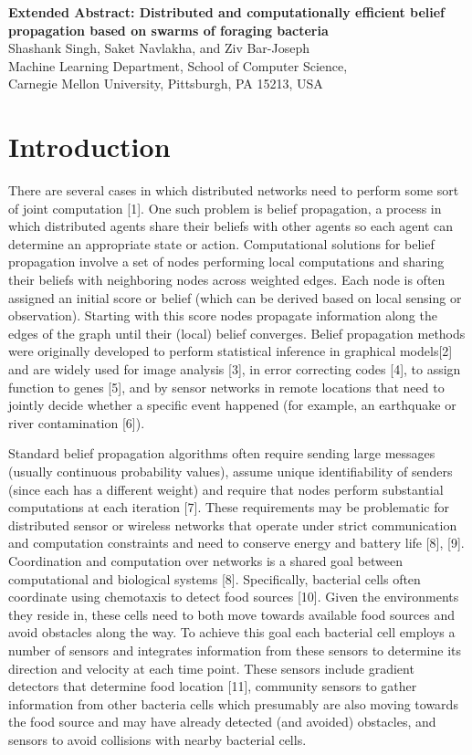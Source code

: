 \documentclass{article}
\begin{document}
\begin{center}
{\bf\Large Extended Abstract: Distributed and computationally efficient belief
propagation based on swarms of foraging bacteria}\\
Shashank Singh, Saket Navlakha, and Ziv Bar-Joseph\\
Machine Learning Department, School of Computer Science,\\
Carnegie Mellon University, Pittsburgh, PA 15213, USA
\end{center}

\section*{Introduction}
There are several cases in which distributed networks need to perform some sort
of joint computation [1]. One such problem is belief propagation, a process in
which distributed agents share their beliefs with other agents so each agent
can determine an appropriate state or action.
Computational solutions for belief propagation involve a set of nodes
performing local computations and sharing their beliefs with neighboring nodes
across weighted edges. Each node is often assigned an initial score or belief
(which can be derived based on local sensing or observation). Starting with
this score nodes propagate information along the edges of the graph until their
(local) belief converges. Belief propagation methods were originally developed
to perform statistical inference in graphical models[2] and are widely used for
image analysis [3], in error correcting codes [4], to assign function to genes
[5], and by sensor networks in remote locations that need to jointly decide
whether a specific event happened (for example,  an earthquake or river
contamination [6]).
 
Standard belief propagation algorithms often require sending large messages
(usually continuous probability values), assume unique identifiability of
senders (since each has a different weight) and require that nodes perform
substantial computations at each iteration [7]. These requirements may be
problematic for distributed sensor or wireless networks that operate under
strict communication and computation constraints and need to conserve energy
and battery life [8], [9]. Coordination and computation over networks is a
shared goal between computational and biological systems [8]. Specifically,
bacterial cells often coordinate using chemotaxis to detect food sources [10].
Given the environments they reside in, these cells need to both move towards
available food sources and avoid obstacles along the way. To achieve this goal
each bacterial cell employs a number of sensors and integrates information from
these sensors to determine its direction and velocity at each time point. These
sensors include gradient detectors that determine food location [11], community
sensors to gather information from other bacteria cells which presumably are
also moving towards the food source and may have already detected (and avoided)
obstacles, and sensors to avoid collisions with nearby bacterial cells.
\end{document}
